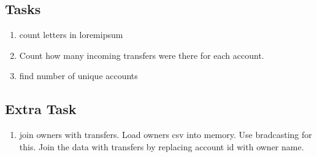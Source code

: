 \documentclass{article}
\begin{document}
\subsection*{Tasks}

\begin{enumerate}
\item count letters in loremipsum
\item Count how many incoming transfers were there for each account.
\item find number of unique accounts
\end{enumerate}

\subsection*{Extra Task}
\begin{enumerate}
\item join owners with transfers. Load owners csv into memory. Use bradcasting for this. Join the data with transfers by replacing account id with owner name.
\end{enumerate}
\end{document}
